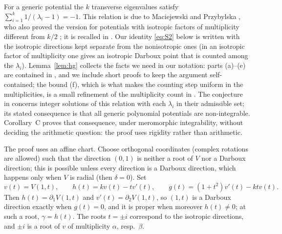 \documentclass[11pt]{article}
\numberwithin{equation}{section}
\theoremstyle{definition}
\theoremstyle{remark}
\begin{document}
For a generic potential the $k$ transverse eigenvalues satisfy $\sum_{i=1}^k1/(\lambda_i-1)=-1$. This relation is due
to Maciejewski and Przybylska \cite[Corollary~2.1, Theorem~1.2]{MP05}, who also proved the version for potentials with isotropic
factors of multiplicity different from $k/2$ \cite[Theorem~2.3, eq.~(2.42)]{MP05}; it is recalled in
\cite[Sec.~VI, eq.~(51)]{PSM23}. Our identity \eqref{eq:S2} below is \cite[eq.~(2.42)]{MP05} written with the isotropic
directions kept separate from the nonisotropic ones (in \cite{MP05} an isotropic factor of multiplicity one gives an
isotropic Darboux point that is counted among the $\lambda_i$). Lemma~\ref{lem:hg} collects the facts we need in our
notation: parts (a)--(e) are contained in \cite[Sec.~II, eq.~(2.30), Propositions~2.7--2.9 and the proofs of
Theorems~2.1 and~2.3]{MP05}, and we include short proofs to keep the argument self-contained; the bound (f), which is
what makes the counting step uniform in the multiplicities, is a small refinement of the multiplicity count in
\cite[Propositions~2.8--2.9]{MP05}. The conjecture in \cite[Sec.~VI]{PSM23} concerns integer solutions of this
relation with each $\lambda_i$ in their admissible set; its stated consequence is that all generic polynomial
potentials are non-integrable. Corollary~C proves that consequence, under meromorphic integrability, without deciding
the arithmetic question: the proof uses rigidity rather than arithmetic.

The proof uses an affine chart. Choose orthogonal coordinates (complex rotations are allowed) such that the direction
$(0,1)$ is neither a root of $V$ nor a Darboux direction; this is possible unless every direction is a Darboux
direction, which happens only when $V$ is radial (then $\delta=0$). Set
\begin{equation}\label{eq:hg}
v(t)=V(1,t),\qquad h(t)=kv(t)-tv'(t),\qquad g(t)=(1+t^2)v'(t)-ktv(t).
\end{equation}
Then $h(t)=\partial_1V(1,t)$ and $v'(t)=\partial_2V(1,t)$, so $(1,t)$ is a Darboux direction exactly when $g(t)=0$,
and it is proper when moreover $h(t)\ne0$; at such a root, $\gamma=h(t)$. The roots $t=\pm i$ correspond to the
isotropic directions, and $\pm i$ is a root of $v$ of multiplicity $\alpha$, resp.\ $\beta$.
\end{document}
